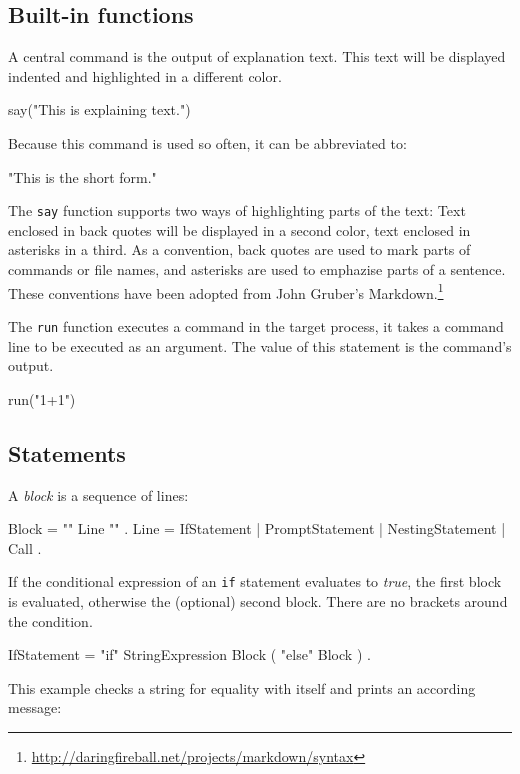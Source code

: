 \documentclass[paper=a4,twoside,abstract=on,cleardoublepage=empty,numbers=noenddot,toc=bib,12pt,appendixprefix=true]{scrreprt}
\begin{document}
\subsection{Built-in functions}

A central command is the output of explanation text. This text will be displayed indented and highlighted in a different color.

\begin{nutsh}
say("This is explaining text.")
\end{nutsh}
%
Because this command is used so often, it can be abbreviated to:

\begin{nutsh}
"This is the short form."
\end{nutsh}
%
The \texttt{say} function supports two ways of highlighting parts of the text: Text enclosed in back quotes will be displayed in a second color, text enclosed in asterisks in a third. As a convention, back quotes are used to mark parts of commands or file names, and asterisks are used to emphazise parts of a sentence. These conventions have been adopted from John Gruber's Markdown.\footnote{\url{http://daringfireball.net/projects/markdown/syntax}}

The \texttt{run} function executes a command in the target process, it takes a command line to be executed as an argument. The value of this statement is the command's output.

\begin{nutsh}
run("1+1")
\end{nutsh}

\subsection{Statements}
\label{sec:statements}


A \emph{block} is a sequence of lines:

\begin{ebnf}
Block = "{" { Line } "}" .
Line = IfStatement | PromptStatement | NestingStatement | Call .
\end{ebnf}


If the conditional expression of an \texttt{if} statement evaluates to \emph{true}, the first block is evaluated, otherwise the (optional) second block. There are no brackets around the condition.

\begin{ebnf}
IfStatement = "if" StringExpression Block ( "else" Block ) .
\end{ebnf}
%
This example checks a string for equality with itself and prints an according message:
\end{document}
